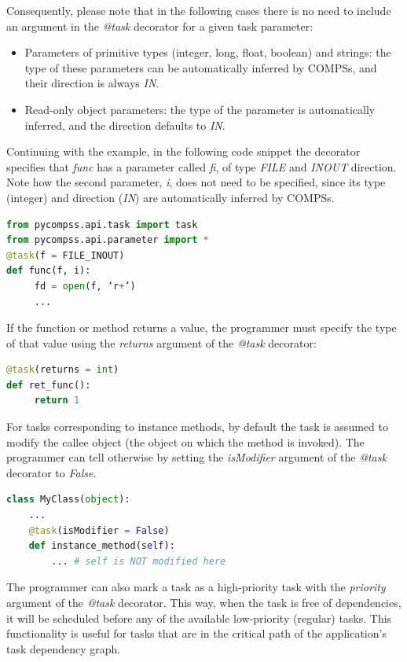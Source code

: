 Consequently, please note that in the following cases there is no need to include an argument in the {\it @task} decorator for a given task parameter:

\begin{itemize}
 \item Parameters of primitive types (integer, long, float, boolean) and strings: the type of these parameters can be automatically inferred by COMPSs, and their direction is always {\it IN}.
 \item Read-only object parameters: the type of the parameter is automatically inferred, and the direction defaults to {\it IN}.
\end{itemize}
 
Continuing with the example, in the following code snippet the decorator specifies that {\it func} has a parameter called {\it fi}, of type {\it FILE} and {\it INOUT} direction. Note how the second parameter, {\it i}, does not need to be specified, since its type (integer) and direction ({\it IN}) are automatically inferred by COMPSs.

\begin{lstlisting}[language=python]
from pycompss.api.task import task
from pycompss.api.parameter import *
@task(f = FILE_INOUT)
def func(f, i):
     fd = open(f, ‘r+’)
     ...
\end{lstlisting}

If the function or method returns a value, the programmer must specify the type of that value using the {\it returns} argument of the {\it @task} decorator:

\begin{lstlisting}[language=python]
@task(returns = int)
def ret_func():
     return 1
\end{lstlisting}

For tasks corresponding to instance methods, by default the task is assumed to modify the callee object (the object on which the method is invoked). The programmer can tell otherwise by setting the {\it isModifier} argument of the {\it @task} decorator to {\it False}.

\begin{lstlisting}[language=python]
class MyClass(object):
    ...
    @task(isModifier = False)
    def instance_method(self):
        ... # self is NOT modified here
\end{lstlisting}

The programmer can also mark a task as a high-priority task with the {\it priority} argument of the {\it @task} decorator. This way, when the task is free of dependencies, it will be scheduled before any of the available low-priority (regular) tasks. This functionality is useful for tasks that are in the critical path of the application’s task dependency graph.

